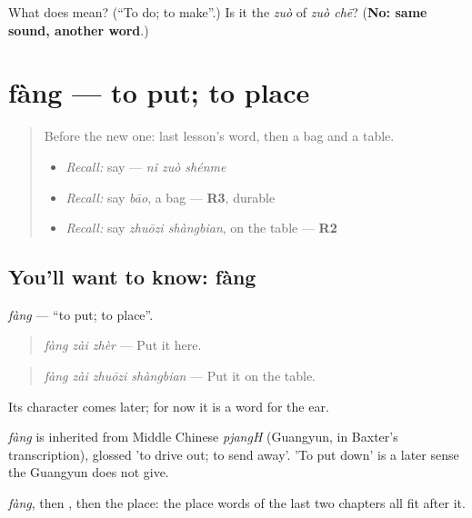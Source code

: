 \begin{tcolorbox}[breakable,colback=teal!4,colframe=teal!35!black,title={Before you move on}]
What does  mean? (\textquotedblleft{}To do; to make\textquotedblright{}.) Is it the \emph{zuò} of \emph{zuò chē}? (\textbf{No: same sound, another word}.)
\end{tcolorbox}
\section[fàng]{fàng — to put; to place}

\label{lesson:ZH-C89-fang}



\begin{quote}
Before the new one: last lesson's word, then a bag and a table.

\begin{itemize}
\raggedright
  \item \emph{Recall:} say  — \emph{nǐ zuò shénme}
  \item \emph{Recall:} say \emph{bāo}, a bag — \textbf{R3}, durable
  \item \emph{Recall:} say \emph{zhuōzi shàngbian}, on the table — \textbf{R2}
\end{itemize}
\end{quote}

\subsection*{You'll want to know: fàng}
\emph{fàng} — \textquotedblleft{}to put; to place\textquotedblright{}.

\begin{quote}
\emph{fàng zài zhèr} — Put it here.
\end{quote}

\begin{quote}
\emph{fàng zài zhuōzi shàngbian} — Put it on the table.
\end{quote}

Its character comes later; for now it is a word for the ear.

\begin{cousinweb}
\emph{fàng} is inherited from Middle Chinese \emph{pjangH} (Guangyun, in Baxter's transcription), glossed 'to drive out; to send away'. 'To put down' is a later sense the Guangyun does not give.
\end{cousinweb}

\begin{grammarlens}[title={What you've built}]
\emph{fàng}, then , then the place: the place words of the last two chapters all fit after it.
\end{grammarlens}

